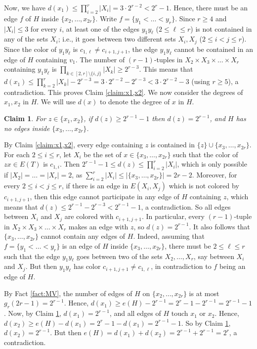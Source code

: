 \documentclass[11pt]{article}
\let\oldendproof\endproof
\renewenvironment{proof}[1][\proofname]{%
	\oldproof[\bf #1]%
}{\oldendproof}
\theoremstyle{plain}
\newtheorem{claim}[theorem]{Claim}
\begin{document}
\begin{proof}
        Now, we have $d(x_1) \leq \prod_{i=2}^r |X_i| = 3 \cdot 2^{r-2} < 2^r-1$.
		Hence, there must be an edge $f$ of $H$ inside $\{x_2,\dots,x_{2r}\}$. 
        Write $f = \{y_1 < \dots < y_r\}$. Since $r \geq 4$ and $|X_i| \leq 3$ for every $i$, at least one of the edges $y_1y_{\ell}$ ($2 \leq \ell \leq r$) is not contained in any of the sets $X_i$; i.e., it goes between two different sets $X_i,X_j$ ($2 \leq i < j \leq r$). Since the color of $y_1y_{\ell}$ is $c_{1,\ell} \neq c_{i+1,j+1}$, the edge $y_1y_{\ell}$ cannot be contained in an edge of $H$ containing $v_1$. The number of $(r-1)$-tuples in $X_2 \times X_3 \times \dots \times X_r$ containing $y_1y_{\ell}$ is 
		$\prod_{k \in [2,r] \setminus \{i,j\}}|X_k| \geq 2^{r-3}$.
        This means that 
        $d(x_1) \leq \prod_{k=2}^r |X_k| - 2^{r-3} = 3 \cdot 2^{r-2} - 2^{r-3} < 3 \cdot 2^{r-2} -3$ (using $r\geq 5$), a contradiction. This proves Claim \ref{claim:x1,x2}.
	\end{proof}
    \noindent
    We now consider the degrees of $x_1,x_2$ in $H$. We will use $d(x)$ to denote the degree of $x$ in $H$. 
    \begin{claim}\label{claim:degrees of x1,x2}
        For $z \in \{x_1,x_2\}$, if $d(z) \geq 2^{r-1}-1$ then $d(z) = 2^{r-1}$, and $H$ has no edges inside 
        $\{x_3,\dots,x_{2r}\}$.
    \end{claim}
    \begin{proof}
        By Claim \ref{claim:x1,x2}, every edge containing $z$ is contained in $\{z\} \cup \{x_3,\dots,x_{2r}\}$. 
        For each $2 \leq i \leq r$, let $X_i$ be the set of $x \in \{x_3,\dots,x_{2r}\}$ such that the color of $zx \in E(T)$ is $c_{1,i}$. Then $2^{r-1}-1 \leq d(z) \leq \prod_{i=2}^r |X_i|$, which is only possible if $|X_2| = \dots = |X_r| = 2$, as $\sum_{i=2}^r |X_i| \leq |\{x_3,\dots,x_{2r}\}| = 2r-2$. Moreover, for every $2 \leq i < j \leq r$, if there is an edge in $E(X_i,X_j)$ which is not colored by $c_{i+1,j+1}$, then this edge cannot participate in any edge of $H$ containing $z$, which means that $d(z) \leq 2^{r-1} - 2^{r-3} < 2^{r-1}-1$, a contradiction. So all edges between $X_i$ and $X_j$ are colored with $c_{i+1,j+1}$. 
        In particular, every $(r-1)$-tuple in $X_2 \times X_3 \times \dots \times X_r$ makes an edge with $z$, so $d(z) = 2^{r-1}$. 
        It also follows that $\{x_3,\dots,x_{2r}\}$ cannot contain any edges of $H$. Indeed, assuming that $f = \{y_1 < \dots < y_r\}$ is an edge of $H$ inside $\{x_3,\dots,x_{2r}\}$, there must be $2 \leq \ell \leq r$ such that the edge $y_1y_{\ell}$ goes between two of the sets $X_2,\dots,X_r$, say between $X_i$ and $X_j$. But then $y_1y_{\ell}$ has color $c_{i+1,j+1} \neq c_{1,\ell}$, in contradiction to $f$ being an edge of $H$.
    \end{proof}
    
    By Fact \ref{fact:MV}, the number of edges of $H$ on $\{x_2,\dots,x_{2r}\}$ is at most $g_r(2r-1) = 2^{r-1}$. Hence, $d(x_1) \geq e(H) - 2^{r-1} = 2^r - 1 - 2^{r-1} = 2^{r-1}-1$. Now, by Claim \ref{claim:degrees of x1,x2}, $d(x_1) = 2^{r-1}$, and all edges of $H$ touch $x_1$ or $x_2$. Hence, 
    $d(x_2) \geq e(H)-d(x_1) = 2^r-1 - d(x_1) = 2^{r-1}-1$. So by Claim \ref{claim:degrees of x1,x2}, $d(x_2) = 2^{r-1}$. But then $e(H) = d(x_1) + d(x_2) = 2^{r-1} + 2^{r-1} = 2^r$, a contradiction. 
\end{document}
